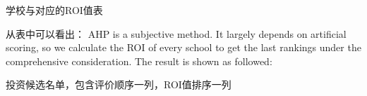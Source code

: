 学校与对应的ROI值表

从表中可以看出：
AHP is a subjective method. It largely depends on artificial scoring, so we calculate the ROI of every school to get the last rankings under the comprehensive consideration. The result is shown as followed:

投资候选名单，包含评价顺序一列，ROI值排序一列


